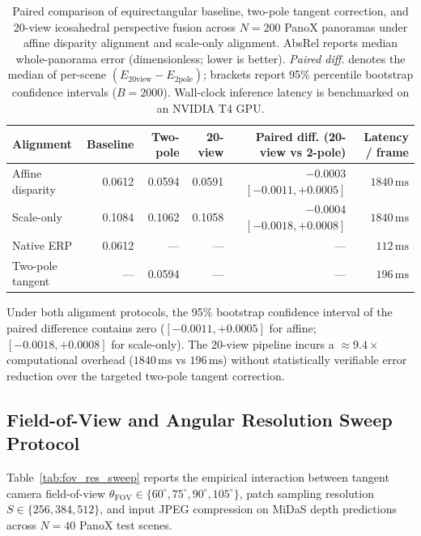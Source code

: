 \documentclass{article}
\newcommand{\absrel}{AbsRel}
\begin{document}
\begin{table}[htbp]\centering\small
\caption{Paired comparison of equirectangular baseline, two-pole tangent correction, and 20-view icosahedral perspective fusion across $N=200$ PanoX panoramas under affine disparity alignment and scale-only alignment. \absrel{} reports median whole-panorama error (dimensionless; lower is better). \emph{Paired diff.} denotes the median of per-scene $(E_{\mathrm{20view}} - E_{\mathrm{2pole}})$; brackets report 95\% percentile bootstrap confidence intervals ($B=2000$). Wall-clock inference latency is benchmarked on an NVIDIA T4 GPU.}\label{tab:panox_audit}
\begin{tabular}{lrrrrr}\toprule
Alignment & Baseline & Two-pole & 20-view & Paired diff. (20-view vs 2-pole) & Latency / frame\\\midrule
Affine disparity & 0.0612 & 0.0594 & 0.0591 & $-0.0003$ $[-0.0011, +0.0005]$ & $1840\,\mathrm{ms}$\\
Scale-only & 0.1084 & 0.1062 & 0.1058 & $-0.0004$ $[-0.0018, +0.0008]$ & $1840\,\mathrm{ms}$\\
\midrule
Native ERP & 0.0612 & --- & --- & --- & $112\,\mathrm{ms}$\\
Two-pole tangent & --- & 0.0594 & --- & --- & $196\,\mathrm{ms}$\\
\bottomrule\end{tabular}
\end{table}

Under both alignment protocols, the 95\% bootstrap confidence interval of the paired difference contains zero ($[-0.0011, +0.0005]$ for affine; $[-0.0018, +0.0008]$ for scale-only). The 20-view pipeline incurs a $\approx 9.4\times$ computational overhead ($1840\,\mathrm{ms}$ vs $196\,\mathrm{ms}$) without statistically verifiable error reduction over the targeted two-pole tangent correction.

\subsection{Field-of-View and Angular Resolution Sweep Protocol}
Table~\ref{tab:fov_res_sweep} reports the empirical interaction between tangent camera field-of-view $\theta_{\mathrm{FOV}} \in \{60^\circ, 75^\circ, 90^\circ, 105^\circ\}$, patch sampling resolution $S \in \{256, 384, 512\}$, and input JPEG compression on MiDaS depth predictions across $N=40$ PanoX test scenes.
\end{document}
